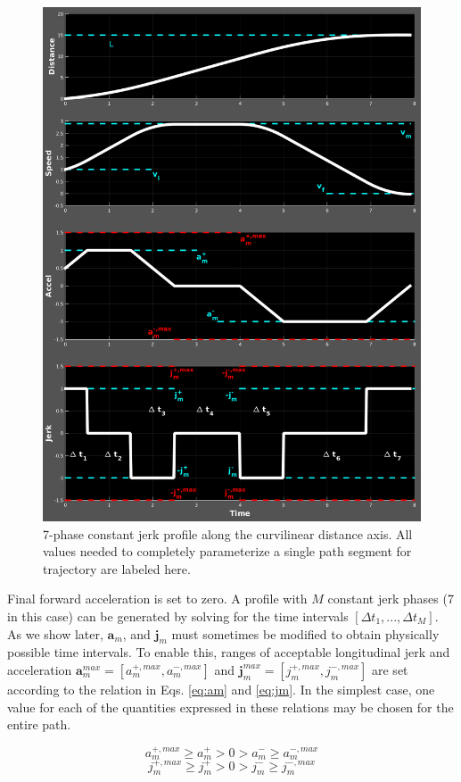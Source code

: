 \documentclass[letterpaper, 10 pt, conference]{ieeeconf}  %
\begin{document}
\begin{figure}[tb]
  \centering
  \includegraphics[width=0.8\columnwidth]{graphics/Full7PhaseSpecVertical.png}
  \caption{
    7-phase constant jerk profile along the curvilinear distance axis.
    All values needed to completely parameterize a single path segment for trajectory are labeled here.}
  \label{fig:full7phasespec}
\end{figure}


Final forward acceleration is set to zero.
A profile with $M$ constant jerk phases (7 in this case) can be generated by solving for the time intervals $[\Delta t_1, ..., \Delta t_M]$.
As we show later, $\mathbf{a}_m$, and $\mathbf{j}_m$ must sometimes be modified to obtain physically possible time intervals.
To enable this, ranges of acceptable longitudinal jerk and acceleration $\mathbf{a}^{max}_m = [a^{+,max}_m , a^{-,max}_m]$ and $\mathbf{j}^{max}_m = [j^{+,max}_m , j^{-,max}_m]$ are set according to the relation in Eqs. \ref{eq:am} and \ref{eq:jm}.
In the simplest case, one value for each of the quantities expressed in these relations may be chosen for the entire path.

\begin{equation}
  a^{+,max}_m \geqslant a^+_m > 0 > a^-_m \geqslant a^{-,max}_m
  \label{eq:am}
\end{equation}
\begin{equation}
  j^{+,max}_m \geqslant j^+_m > 0 > j^-_m \geqslant j^{-,max}_m
  \label{eq:jm}
\end{equation}
\end{document}

